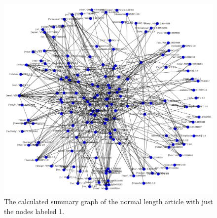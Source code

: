 \begin{figure}[!ht]
	\centering
	\includegraphics[width=150mm, keepaspectratio]{figures/large_predicted.png}
	\caption{The calculated summary graph of the normal length article with just the nodes labeled 1.}
	\label{fig:large_summary_calculated0}
\end{figure}

